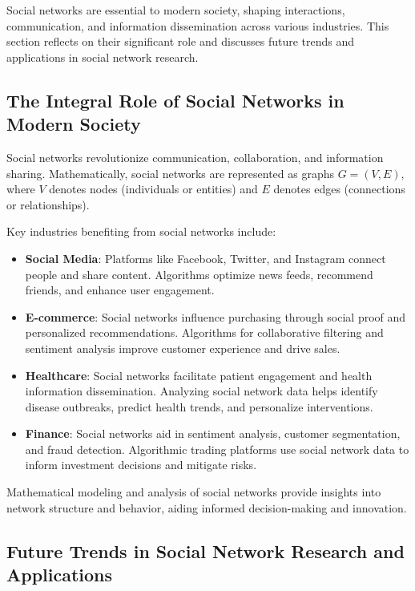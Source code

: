 \documentclass[12pt]{book} %
\begin{document}
Social networks are essential to modern society, shaping interactions, communication, and information dissemination across various industries. This section reflects on their significant role and discusses future trends and applications in social network research.

\subsection{The Integral Role of Social Networks in Modern Society}

Social networks revolutionize communication, collaboration, and information sharing. Mathematically, social networks are represented as graphs \(G = (V, E)\), where \(V\) denotes nodes (individuals or entities) and \(E\) denotes edges (connections or relationships).

Key industries benefiting from social networks include:

\begin{itemize}
    \item \textbf{Social Media}: Platforms like Facebook, Twitter, and Instagram connect people and share content. Algorithms optimize news feeds, recommend friends, and enhance user engagement.
    
    \item \textbf{E-commerce}: Social networks influence purchasing through social proof and personalized recommendations. Algorithms for collaborative filtering and sentiment analysis improve customer experience and drive sales.
    
    \item \textbf{Healthcare}: Social networks facilitate patient engagement and health information dissemination. Analyzing social network data helps identify disease outbreaks, predict health trends, and personalize interventions.
    
    \item \textbf{Finance}: Social networks aid in sentiment analysis, customer segmentation, and fraud detection. Algorithmic trading platforms use social network data to inform investment decisions and mitigate risks.
\end{itemize}

Mathematical modeling and analysis of social networks provide insights into network structure and behavior, aiding informed decision-making and innovation.

\subsection{Future Trends in Social Network Research and Applications}
\end{document}
